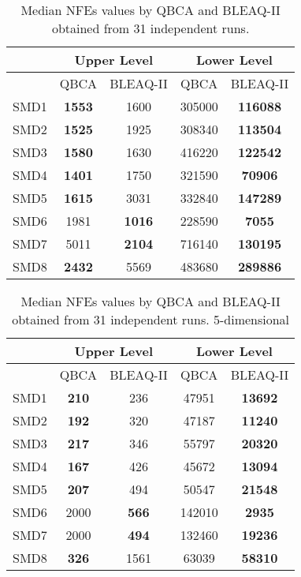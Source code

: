 \documentclass[conference]{IEEEtran}
\theoremstyle{definition}
\begin{document}
\begin{table}[t]
    \caption{Median NFEs values by QBCA and BLEAQ-II obtained from 31 independent runs.}
    \label{tab:ul-comparative-fes}
    \centering
    \begin{tabular}{|c|c|c|c|c|}
\hline
& \multicolumn{2}{c|}{Upper Level} & \multicolumn{2}{c|}{Lower Level} \\ \hline
& QBCA & BLEAQ-II & QBCA & BLEAQ-II \\ \hline
SMD1 & \textbf{1553}  & 1600          &  305000 & \textbf{116088} \\ \hline
SMD2 & \textbf{1525}  & 1925          &  308340 & \textbf{113504} \\ \hline
SMD3 & \textbf{1580}  & 1630          &  416220 & \textbf{122542} \\ \hline
SMD4 & \textbf{1401} & 1750  &  321590 & \textbf{70906} \\ \hline
SMD5 & \textbf{1615}  & 3031          &  332840 & \textbf{147289} \\ \hline
SMD6 & 1981 &  \textbf{1016} &   228590& \textbf{7055} \\ \hline
SMD7 & 5011 &  \textbf{2104} & 716140  & \textbf{130195} \\ \hline
SMD8 & \textbf{2432}  & 5569          &  483680 & \textbf{289886} \\ \hline
    \end{tabular}
\end{table}

\begin{table}[t]
    \caption{Median NFEs values by QBCA and BLEAQ-II obtained from 31 independent runs. 5-dimensional}
    \label{tab:ul-comparative-fes-5}
    \centering
    \begin{tabular}{|c|c|c|c|c|}
\hline
& \multicolumn{2}{c|}{Upper Level} & \multicolumn{2}{c|}{Lower Level} \\ \hline
& QBCA & BLEAQ-II & QBCA & BLEAQ-II \\ \hline
SMD1 & \textbf{210} & 236 & 47951 & \textbf{13692}  \\ \hline 
SMD2 & \textbf{192} & 320 & 47187 & \textbf{11240}  \\ \hline 
SMD3 & \textbf{217} & 346 & 55797 & \textbf{20320}  \\ \hline 
SMD4 & \textbf{167} & 426 & 45672 & \textbf{13094}  \\ \hline 
SMD5 & \textbf{207} & 494 & 50547 & \textbf{21548}  \\ \hline 
SMD6 & 2000 & \textbf{566} & 142010 & \textbf{2935}  \\ \hline 
SMD7 & 2000 & \textbf{494} & 132460 & \textbf{19236}  \\ \hline 
SMD8 & \textbf{326} & 1561 & 63039 & \textbf{58310}  \\ \hline 
    \end{tabular}
\end{table}
\end{document}
